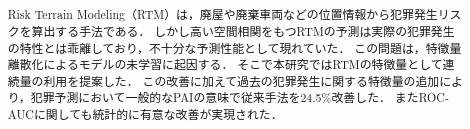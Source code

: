 \usepackage{color}
\usepackage{url}
\usepackage{doi}
\usepackage{lmodern}
\usepackage{amsmath}
\usepackage{mathtools}
\usepackage{amsthm}
\usepackage{amssymb}
\usepackage{booktabs}
\usepackage[dvipdfmx]{graphicx}
\usepackage{listings}
\usepackage{float} 
\usepackage{placeins}
\usepackage[nameinlink]{cleveref}
\usepackage{subcaption}

\usepackage{lipsum}

\let\OLDthebibliography\thebibliography
\renewcommand\thebibliography[1]{
  \OLDthebibliography{#1}
  \setlength{\parskip}{0pt}
  \setlength{\itemsep}{0pt plus 0.3ex}
}


\newcommand{\yj}[1]{{#1}^{(\lambda)}}
\newcommand{\yjj}[1]{{#1}^{(\lambda_j)}}
\newcommand{\yjs}[1]{{#1}^{(\lambda*)}}
\newcommand{\tr}[1]{{#1}^\top}
\newcommand{\yjv}{\xi}
\newcommand{\real}{\mathbb{R}}
\newcommand{\cfsq}{$\text{CF}^2$}

\title{
}


\author{%
\and
{}
}



\begin{abstract}
Risk Terrain Modeling（RTM）は，廃屋や廃棄車両などの位置情報から犯罪発生リスクを算出する手法である．
しかし高い空間相関をもつRTMの予測は実際の犯罪発生の特性とは乖離しており，不十分な予測性能として現れていた．
この問題は，特徴量離散化によるモデルの未学習に起因する．
そこで本研究ではRTMの特徴量として連続量の利用を提案した．
この改善に加えて過去の犯罪発生に関する特徴量の追加により，犯罪予測において一般的なPAIの意味で従来手法を24.5\%改善した．
またROC-AUCに関しても統計的に有意な改善が実現された．
\end{abstract}


